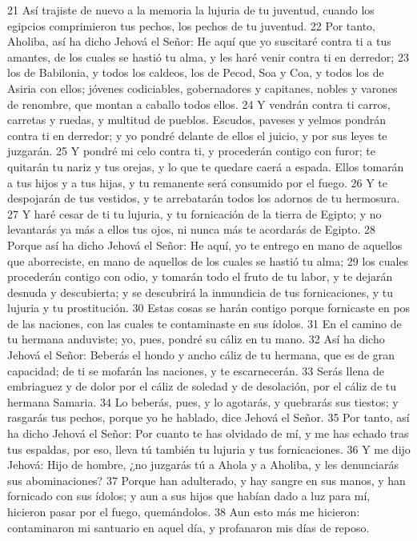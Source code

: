 21 Así trajiste de nuevo a la memoria la lujuria de tu juventud, cuando los egipcios comprimieron tus pechos, los pechos de tu juventud.
22 Por tanto, Aholiba, así ha dicho Jehová el Señor: He aquí que yo suscitaré contra ti a tus amantes, de los cuales se hastió tu alma, y les haré venir contra ti en derredor;
23 los de Babilonia, y todos los caldeos, los de Pecod, Soa y Coa, y todos los de Asiria con ellos; jóvenes codiciables, gobernadores y capitanes, nobles y varones de renombre, que montan a caballo todos ellos.
24 Y vendrán contra ti carros, carretas y ruedas, y multitud de pueblos. Escudos, paveses y yelmos pondrán contra ti en derredor; y yo pondré delante de ellos el juicio, y por sus leyes te juzgarán.
25 Y pondré mi celo contra ti, y procederán contigo con furor; te quitarán tu nariz y tus orejas, y lo que te quedare caerá a espada. Ellos tomarán a tus hijos y a tus hijas, y tu remanente será consumido por el fuego.
26 Y te despojarán de tus vestidos, y te arrebatarán todos los adornos de tu hermosura.
27 Y haré cesar de ti tu lujuria, y tu fornicación de la tierra de Egipto; y no levantarás ya más a ellos tus ojos, ni nunca más te acordarás de Egipto.
28 Porque así ha dicho Jehová el Señor: He aquí, yo te entrego en mano de aquellos que aborreciste, en mano de aquellos de los cuales se hastió tu alma;
29 los cuales procederán contigo con odio, y tomarán todo el fruto de tu labor, y te dejarán desnuda y descubierta; y se descubrirá la inmundicia de tus fornicaciones, y tu lujuria y tu prostitución.
30 Estas cosas se harán contigo porque fornicaste en pos de las naciones, con las cuales te contaminaste en sus ídolos.
31 En el camino de tu hermana anduviste; yo, pues, pondré su cáliz en tu mano.
32 Así ha dicho Jehová el Señor: Beberás el hondo y ancho cáliz de tu hermana, que es de gran capacidad; de ti se mofarán las naciones, y te escarnecerán.
33 Serás llena de embriaguez y de dolor por el cáliz de soledad y de desolación, por el cáliz de tu hermana Samaria.
34 Lo beberás, pues, y lo agotarás, y quebrarás sus tiestos; y rasgarás tus pechos, porque yo he hablado, dice Jehová el Señor.
35 Por tanto, así ha dicho Jehová el Señor: Por cuanto te has olvidado de mí, y me has echado tras tus espaldas, por eso, lleva tú también tu lujuria y tus fornicaciones.
36 Y me dijo Jehová: Hijo de hombre, ¿no juzgarás tú a Ahola y a Aholiba, y les denunciarás sus abominaciones?
37 Porque han adulterado, y hay sangre en sus manos, y han fornicado con sus ídolos; y aun a sus hijos que habían dado a luz para mí, hicieron pasar por el fuego, quemándolos.
38 Aun esto más me hicieron: contaminaron mi santuario en aquel día, y profanaron mis días de reposo.
